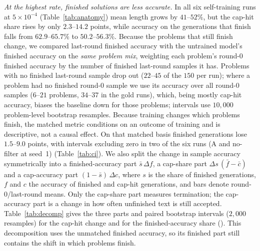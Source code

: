 \documentclass[runningheads]{llncs}
\begin{document}
\emph{At the highest rate, finished solutions are less accurate.} In all six
self-training runs at $5\times10^{-4}$ (Table~\ref{tab:anatomy}) mean length grows
by $41$--$52\%$, but the cap-hit share rises by only $2.3$--$14.2$ points, while
accuracy on the generations that finish falls from $62.9$--$65.7\%$ to
$50.2$--$56.3\%$. Because the problems that still finish change, we compared
last-round finished accuracy with the untrained model's finished accuracy on the
\emph{same problem mix}, weighting each problem's round-0 finished accuracy by
the number of finished last-round samples it has. Problems with no finished
last-round sample drop out ($22$--$45$ of the $150$ per run); where a problem had
no finished round-0 sample we use its accuracy over all round-0 samples
($6$--$21$ problems, $34$--$37$ in the gold runs), which, being mostly cap-hit
accuracy, biases the baseline down for those problems; intervals use $10{,}000$
problem-level bootstrap resamples. Because training changes which problems
finish, the matched metric conditions on an outcome of training and is
descriptive, not a causal effect. On that matched basis finished
generations lose $1.5$--$9.0$ points, with intervals excluding zero in two of
the six runs (A and no-filter at seed~1) (Table~\ref{tab:ci}). We also split the change in sample accuracy
symmetrically into a finished-accuracy part
$\bar s\,\Delta f$, a cap-share part $\Delta s\,(\bar f-\bar c)$ and a
cap-accuracy part $(1-\bar s)\,\Delta c$, where $s$ is the share of finished
generations, $f$ and $c$ the accuracy of finished and cap-hit generations, and
bars denote round-0/last-round means. Only the cap-share part measures
termination; the cap-accuracy part is a change in how often unfinished text is
still accepted. Table~\ref{tab:decomp} gives the three parts and paired
bootstrap intervals ($2{,}000$ resamples) for the cap-hit change and for the
finished-accuracy share ().
This decomposition uses the unmatched finished accuracy, so its finished part
still contains the shift in which problems finish.
\end{document}
